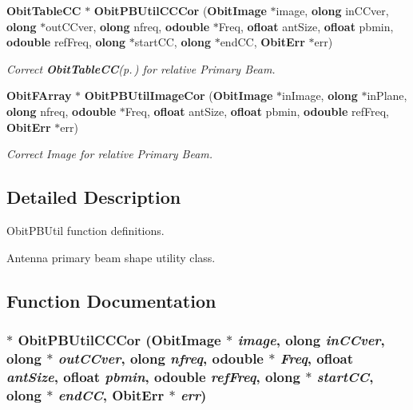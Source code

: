 \begin{CompactItemize}
{\bf Obit\-Table\-CC} $\ast$ {\bf Obit\-PBUtil\-CCCor} ({\bf Obit\-Image} $\ast$image, {\bf olong} in\-CCver, {\bf olong} $\ast$out\-CCver, {\bf olong} nfreq, {\bf odouble} $\ast$Freq, {\bf ofloat} ant\-Size, {\bf ofloat} pbmin, {\bf odouble} ref\-Freq, {\bf olong} $\ast$start\-CC, {\bf olong} $\ast$end\-CC, {\bf Obit\-Err} $\ast$err)
\begin{CompactList}\small\item\em Correct {\bf Obit\-Table\-CC}{\rm (p.\,\pageref{structObitTableCC})} for relative Primary Beam. \item\end{CompactList}\item 
{\bf Obit\-FArray} $\ast$ {\bf Obit\-PBUtil\-Image\-Cor} ({\bf Obit\-Image} $\ast$in\-Image, {\bf olong} $\ast$in\-Plane, {\bf olong} nfreq, {\bf odouble} $\ast$Freq, {\bf ofloat} ant\-Size, {\bf ofloat} pbmin, {\bf odouble} ref\-Freq, {\bf Obit\-Err} $\ast$err)
\begin{CompactList}\small\item\em Correct Image for relative Primary Beam. \item\end{CompactList}\end{CompactItemize}


\subsection{Detailed Description}
Obit\-PBUtil function definitions. 

Antenna primary beam shape utility class.

\subsection{Function Documentation}
\subsubsection{$\ast$ Obit\-PBUtil\-CCCor ({\bf Obit\-Image} $\ast$ {\em image}, {\bf olong} {\em in\-CCver}, {\bf olong} $\ast$ {\em out\-CCver}, {\bf olong} {\em nfreq}, {\bf odouble} $\ast$ {\em Freq}, {\bf ofloat} {\em ant\-Size}, {\bf ofloat} {\em pbmin}, {\bf odouble} {\em ref\-Freq}, {\bf olong} $\ast$ {\em start\-CC}, {\bf olong} $\ast$ {\em end\-CC}, {\bf Obit\-Err} $\ast$ {\em err})}\label{ObitPBUtil_8c_a4}


